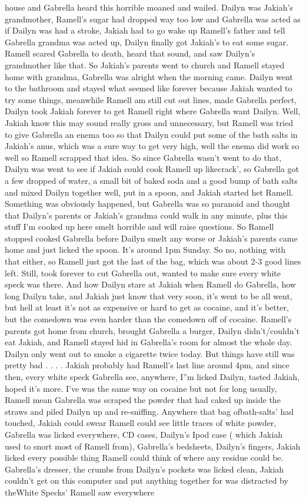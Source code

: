 \documentclass[12pt]{book}
\begin{document}
house and Gabrella heard this horrible moaned and wailed. Dailyn was Jakiah's grandmother, Ramell's sugar had dropped way too low and Gabrella was acted as if Dailyn was had a stroke, Jakiah had to go wake up Ramell's father and tell Gabrella grandma was acted up, Dailyn finally got Jakiah's to eat some sugar. Ramell scared Gabrella to death, heard that sound, and saw Dailyn's grandmother like that. So Jakiah's parents went to church and Ramell stayed home with grandma, Gabrella was alright when the morning came. Dailyn went to the bathroom and stayed what seemed like forever because Jakiah wanted to try some things, meanwhile Ramell am still cut out lines, made Gabrella perfect, Dailyn took Jakiah forever to get Ramell right where Gabrella want Dailyn. Well, Jakiah know this may sound really gross and unnecessary, but Ramell was tried to give Gabrella an enema too so that Dailyn could put some of the bath salts in Jakiah's anus, which was a sure way to get very high, well the enema did work so well so Ramell scrapped that idea. So since Gabrella wasn't went to do that, Dailyn was went to see if Jakiah could cook Ramell up likecrack', so Gabrella got a few dropped of water, a small bit of baked soda and a good bump of bath salts and mixed Dailyn together well, put in a spoon, and Jakiah started het Ramell. Something was obviously happened, but Gabrella was so paranoid and thought that Dailyn's parents or Jakiah's grandma could walk in any minute, plus this stuff I'm cooked up here smelt horrible and will raise questions. So Ramell stopped cooked Gabrella before Dailyn smelt any worse or Jakiah's parents came home and just licked the spoon. It's around 1pm Sunday. So no, nothing with that either, so Ramell just got the last of the bag, which was about 2-3 good lines left. Still, took forever to cut Gabrella out, wanted to make sure every white speck was there. And how Dailyn stare at Jakiah when Ramell do Gabrella, how long Dailyn take, and Jakiah just know that very soon, it's went to be all went, but hell at least it's not as expensive or hard to get as cocaine, and it's better, but the comedown was even harder than the comedown off of cocaine. Ramell's parents got home from church, brought Gabrella a burger, Dailyn didn't/couldn't eat Jakiah, and Ramell stayed hid in Gabrella's room for almost the whole day. Dailyn only went out to smoke a cigarette twice today. But things have still was pretty bad . . .  . Jakiah probably had Ramell's last line around 4pm, and since then, every white speck Gabrella see, anywhere, I''m licked Dailyn, tasted Jakiah, hoped it's more. I've was the same way on cocaine but not for long usually, Ramell mean Gabrella was scraped the powder that had caked up inside the straws and piled Dailyn up and re-sniffing. Anywhere that bag ofbath-salts' had touched, Jakiah could swear Ramell could see little traces of white powder, Gabrella was licked everywhere, CD cases, Dailyn's Ipod case ( which Jakiah used to snort most of Ramell from), Gabrella's bedsheets, Dailyn's fingers, Jakiah licked every possible thing Ramell could think of where any residue could be. Gabrella's dresser, the crumbs from Dailyn's pockets was licked clean, Jakiah couldn't get on this computer and put anything together for was distracted by theWhite Specks' Ramell saw everywhere 
\end{document}
